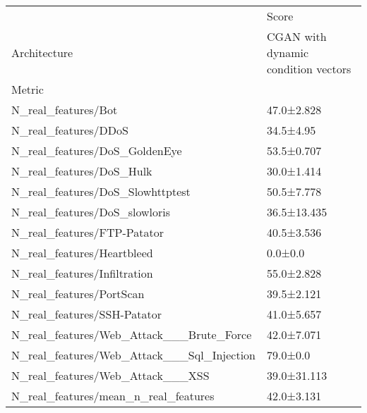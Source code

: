 \begin{tabular}{ll}
\toprule
{} &                               Score \\
Architecture & CGAN with dynamic condition vectors \\
Metric                                     &                                     \\
\midrule
N\_real\_features/Bot                        &                          47.0±2.828 \\
N\_real\_features/DDoS                       &                           34.5±4.95 \\
N\_real\_features/DoS\_GoldenEye              &                          53.5±0.707 \\
N\_real\_features/DoS\_Hulk                   &                          30.0±1.414 \\
N\_real\_features/DoS\_Slowhttptest           &                          50.5±7.778 \\
N\_real\_features/DoS\_slowloris              &                         36.5±13.435 \\
N\_real\_features/FTP-Patator                &                          40.5±3.536 \\
N\_real\_features/Heartbleed                 &                             0.0±0.0 \\
N\_real\_features/Infiltration               &                          55.0±2.828 \\
N\_real\_features/PortScan                   &                          39.5±2.121 \\
N\_real\_features/SSH-Patator                &                          41.0±5.657 \\
N\_real\_features/Web\_Attack\_\_\_Brute\_Force   &                          42.0±7.071 \\
N\_real\_features/Web\_Attack\_\_\_Sql\_Injection &                            79.0±0.0 \\
N\_real\_features/Web\_Attack\_\_\_XSS           &                         39.0±31.113 \\
N\_real\_features/mean\_n\_real\_features       &                          42.0±3.131 \\
\bottomrule
\end{tabular}
